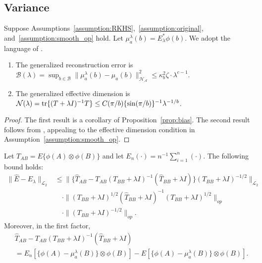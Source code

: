 \subsection{Variance}

\begin{lemma}\label{lemma:bounds}
Suppose Assumptions~\ref{assumption:RKHS},~\ref{assumption:original}, and~\ref{assumption:smooth_op} hold. Let $\mu^{\lambda}_{a}(b)=E_{\lambda}^*\phi(b)$. We adopt the language of \cite{caponnetto2007optimal}.
\begin{enumerate}
    \item The generalized reconstruction error is $\mathcal{B}(\lambda)=\sup_{b\in\mathcal{B}}\|\mu^{\lambda}_a(b)-\mu_a(b)\|^2_{\mathcal{H}_{\mathcal{A}}} \leq \kappa^2_b \zeta \cdot \lambda^{c-1}$.
    \item The generalized effective dimension is $\mathcal{N}(\lambda)=\text{\normalfont tr}\{(T+\lambda I)^{-1}T\}\leq C (\pi/b) \{\sin(\pi/b)\}^{-1}\lambda^{-1/b}$.
\end{enumerate}
\end{lemma}

\begin{proof}
The first result is a corollary of Proposition~\ref{prop:bias}. 
The second result follows from \cite[eq. f]{sutherland2017fixing}, appealing to the effective dimension condition in Assumption~\ref{assumption:smooth_op}.
\end{proof}

\begin{lemma}\label{lemma:decomp}
Let $T_{AB}=E\{\phi(A)\otimes \phi(B)\}$ and let $E_n(\cdot)=n^{-1}\sum_{i=1}^n(\cdot)$. The following bound holds:
\begin{align*}
    \|\hat{E}-E_{\lambda}\|_{\mathcal{L}_2}
    &\leq \|\{\hat{T}_{AB}-T_{AB}(T_{BB}+\lambda I)^{-1}(\hat{T}_{BB}+\lambda I)\}(T_{BB}+\lambda I)^{-1/2}\|_{\mathcal{L}_2} \\
    &\quad \cdot \|(T_{BB}+\lambda I)^{1/2}(\hat{T}_{BB}+\lambda I)^{-1}(T_{BB}+\lambda I)^{1/2}\|_{op} \\
    &\quad \cdot \|(T_{BB}+\lambda I)^{-1/2}\|_{op}.
\end{align*}
Moreover, in the first factor,
\begin{align*}
    &\hat{T}_{AB}-T_{AB}(T_{BB}+\lambda I)^{-1}(\hat{T}_{BB}+\lambda I) \\
    &=E_n[\{\phi(A)-\mu^{\lambda}_a(B)\}\otimes \phi(B)]-E[\{\phi(A)-\mu^{\lambda}_a(B)\}\otimes \phi(B)].
\end{align*}
\end{lemma}

